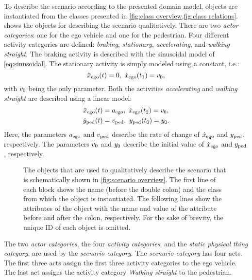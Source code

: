 To describe the scenario according to the presented domain model, objects are instantiated from the classes presented in \cref{fig:class overview,fig:class relations}.  shows the objects for describing the scenario qualitatively. There are two \textit{actor categories}: one for the ego vehicle and one for the pedestrian. Four different activity categories are defined: \emph{braking}, \emph{stationary}, \emph{accelerating}, and \emph{walking straight}. The braking activity is described with the sinusoidal model of \cref{eq:sinusoidal}. The stationary activity is simply modeled using a constant, i.e.:
\begin{equation} \label{eq:constant model}
	\ddot{x}_{\mathrm{ego}}(t) = 0,\ \dot{x}_{\mathrm{ego}}(t_{1}) = v_{0},
\end{equation}
with $v_{0}$ being the only parameter.
Both the activities \emph{accelerating} and \emph{walking straight} are described using a linear model:
\begin{align}
	\ddot{x}_{\mathrm{ego}}(t) &= a_{\mathrm{ego}},\ \dot{x}_{\mathrm{ego}}(t_{2}) = v_{0}, \label{eq:ego accelerating} \\
	\dot{y}_{\mathrm{ped}}(t) &= v_{\mathrm{ped}},\ y_{\mathrm{ped}}(t_{0}) = y_{0}. \label{eq:pedestrian walking}
\end{align}
Here, the parameters $a_{\mathrm{ego}}$ and $v_{\mathrm{ped}}$ describe the rate of change of $\dot{x}_{\mathrm{ego}}$ and $y_{\mathrm{ped}}$, respectively. The parameters $v_{0}$ and $y_{0}$ describe the initial value of $\dot{x}_{\mathrm{ego}}$ and $y_{\mathrm{ped}}$, respectively.


\begin{figure}[t]
	\centering
	
	\caption{The objects that are used to qualitatively describe the scenario that is schematically shown in \cref{fig:scenario overview}. The first line of each block shows the name (before the double colon) and the class from which the object is instantiated. The following lines show the attributes of the object with the name and value of the attribute before and after the colon, respectively. For the sake of brevity, the unique ID of each object is omitted.}
	\label{fig:example qualitative}
\end{figure}


The two \textit{actor categories}, the four \textit{activity categories}, and the \cstartc\textit{static physical thing category}\cendc, are used by the \textit{scenario category}. The \textit{scenario category} has four acts. The first three acts assign the first three activity categories to the ego vehicle. The last act assigns the activity category \emph{Walking straight} to the pedestrian. 



